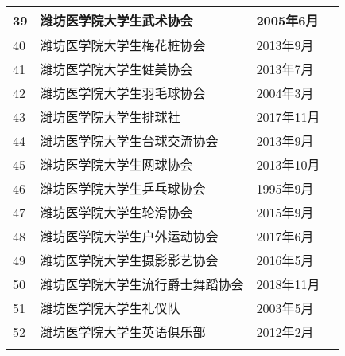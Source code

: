\begin{center}
\begin{tabular}{|>{\centering\arraybackslash}p{2em}|>{\centering\arraybackslash}p{20em}|%
        >{\centering\arraybackslash}p{6em}|>{\centering\arraybackslash}p{5em}|}
        \cline{1-3}
        39 & 潍坊医学院大学生武术协会     & 2005年6月  &                         \\
        \cline{1-3}
        40 & 潍坊医学院大学生梅花桩协会    & 2013年9月  &                         \\
        \cline{1-3}
        41 & 潍坊医学院大学生健美协会     & 2013年7月  &                         \\
        \cline{1-3}
        42 & 潍坊医学院大学生羽毛球协会    & 2004年3月  &                         \\
        \cline{1-3}
        43 & 潍坊医学院大学生排球社      & 2017年11月 &                         \\
        \cline{1-3}
        44 & 潍坊医学院大学生台球交流协会   & 2013年9月  &                         \\
        \cline{1-3}
        45 & 潍坊医学院大学生网球协会     & 2013年10月 &                         \\
        \cline{1-3}
        46 & 潍坊医学院大学生乒乓球协会    & 1995年9月  &                         \\
        \cline{1-3}
        47 & 潍坊医学院大学生轮滑协会     & 2015年9月  &                         \\
        \cline{1-3}
        48 & 潍坊医学院大学生户外运动协会   & 2017年6月  &                         \\
        \cline{1-3}
        49 & 潍坊医学院大学生摄影影艺协会   & 2016年5月  &                         \\
        \cline{1-3}
        50 & 潍坊医学院大学生流行爵士舞蹈协会 & 2018年11月 &                         \\
        \cline{1-3}
        51 & 潍坊医学院大学生礼仪队      & 2003年5月  &                         \\
        \cline{1-3}
        52 & 潍坊医学院大学生英语俱乐部    & 2012年2月  &                         \\
        \Xhline{1.2pt}
    \end{tabular}
\end{center}
